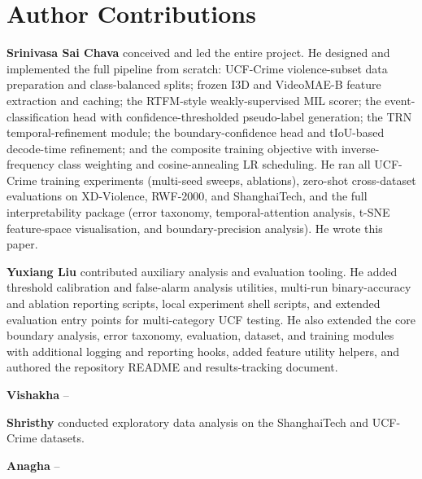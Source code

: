 \documentclass[11pt]{article}
\begin{document}
\section*{Author Contributions}

\textbf{Srinivasa Sai Chava} conceived and led the entire project.
He designed and implemented the full pipeline from scratch: UCF-Crime violence-subset data preparation and class-balanced splits; frozen I3D and VideoMAE-B feature extraction and caching; the RTFM-style weakly-supervised MIL scorer; the event-classification head with confidence-thresholded pseudo-label generation; the TRN temporal-refinement module; the boundary-confidence head and tIoU-based decode-time refinement; and the composite training objective with inverse-frequency class weighting and cosine-annealing LR scheduling.
He ran all UCF-Crime training experiments (multi-seed sweeps, ablations), zero-shot cross-dataset evaluations on XD-Violence, RWF-2000, and ShanghaiTech, and the full interpretability package (error taxonomy, temporal-attention analysis, t-SNE feature-space visualisation, and boundary-precision analysis).
He wrote this paper.

\textbf{Yuxiang Liu} contributed auxiliary analysis and evaluation tooling.
He added threshold calibration and false-alarm analysis utilities, multi-run binary-accuracy and ablation reporting scripts, local experiment shell scripts, and extended evaluation entry points for multi-category UCF testing.
He also extended the core boundary analysis, error taxonomy, evaluation, dataset, and training modules with additional logging and reporting hooks, added feature utility helpers, and authored the repository README and results-tracking document.

\textbf{Vishakha} --

\textbf{Shristhy} conducted exploratory data analysis on the ShanghaiTech and UCF-Crime datasets.

\textbf{Anagha} --



\end{document}
